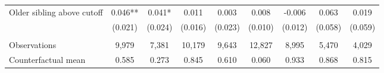 {{\begin{tabular}{lcccccccc}
Older sibling above cutoff&       0.046** &       0.041*  &       0.011   &       0.003   &       0.008   &      -0.006   &       0.063   &       0.019   \\
                    &     (0.021)   &     (0.024)   &     (0.016)   &     (0.023)   &     (0.010)   &     (0.012)   &     (0.058)   &     (0.059)   \\
                    &               &               &               &               &               &               &               &               \\
Observations        &       9,979   &       7,381   &      10,179   &       9,643   &      12,827   &       8,995   &       5,470   &       4,029   \\
Counterfactual mean &       0.585   &       0.273   &       0.845   &       0.610   &       0.060   &       0.933   &       0.868   &       0.815   \\
 

\bottomrule
\end{tabular}
}
}
